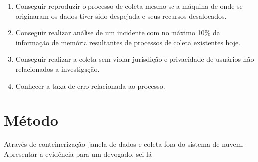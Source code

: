 \documentclass[12pt,				%
	openright,			%
	oneside,			%
	a4paper,			%
	english,			%
	brazil				%
	]{abntex2}
\begin{document}
\begin{enumerate}
 \item Conseguir reproduzir o processo de coleta mesmo se a máquina de onde se originaram os dados tiver sido despejada e seus recursos desalocados.
 \item Conseguir realizar análise de um incidente com no máximo 10\% da informação de memória resultantes de processos de coleta existentes hoje.
 \item Conseguir realizar a coleta sem violar jurisdição e privacidade de usuários não relacionados a investigação.
 \item Conhecer a taxa de erro relacionada ao processo.
\end{enumerate}

\chapter{Método} \label{chap:metodo}
Através de conteinerização, janela de dados e coleta fora do sistema de nuvem. Apresentar a evidência para um devogado, sei lá
\end{document}
